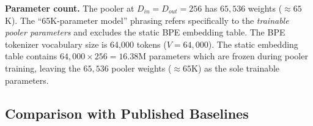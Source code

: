 \documentclass[10pt,journal,compsoc]{IEEEtran}
\begin{document}
\textbf{Parameter count.} The pooler at $D_{in}=D_{out}=256$ has $65{,}536$ weights ($\approx 65$K). The ``65K-parameter model'' phrasing refers specifically to the \emph{trainable pooler parameters} and excludes the static BPE embedding table. The BPE tokenizer vocabulary size is 64,000 tokens ($V = 64{,}000$). The static embedding table contains $64{,}000 \times 256 = 16.38$M parameters which are frozen during pooler training, leaving the $65{,}536$ pooler weights ($\approx 65$K) as the sole trainable parameters.

\subsection{Comparison with Published Baselines}
\begin{table}[t!]
\caption{Comparison with published baselines on STS-B (Spearman correlation $\rho$). Values for external models are taken from the cited publications; hardware platforms differ and runtime values are not directly comparable. The teacher model is re-evaluated under our exact evaluation pipeline.}
\label{tab:external_baselines}
\begin{center}
\end{center}
\end{table}
\end{document}
